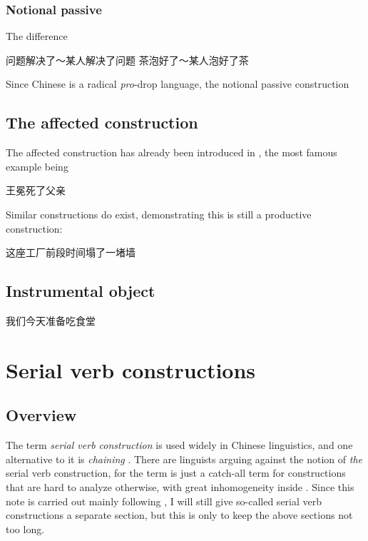 \documentclass[UTF8, a4paper, oneside, scheme=plain]{ctexart}
\newcommand*{\term}[1]{\emph{#1}}
\begin{document}
\subsubsection{Notional passive}

The difference 

\begin{exe}
    \ex 问题解决了～某人解决了问题
    \ex 茶泡好了～某人泡好了茶
\end{exe}

Since Chinese is a radical \term{pro}-drop language,
the notional passive construction 

\subsection{The affected construction}

The affected construction has already been introduced in ,
the most famous example being 
\begin{exe}
    \ex 王冕死了父亲
\end{exe}
Similar constructions do exist, demonstrating this is still a productive construction:
\begin{exe}
    \ex 这座工厂前段时间塌了一堵墙
\end{exe}

\subsection{Instrumental object}

\begin{exe}
    \ex 我们今天准备吃食堂
\end{exe}

\section{Serial verb constructions}

\subsection{Overview}

The term \term{serial verb construction} is used widely in Chinese linguistics,
and one alternative to it is \term{chaining} \citep{po2015chinese}.
There are linguists arguing against the notion of 
\emph{the} serial verb construction,
for the term is just a catch-all term 
for constructions that are hard to analyze otherwise,
with great inhomogeneity inside \citep{paul2008serial}.
Since this note is carried out mainly following \citet{zhudexigrammar},
I will still give so-called serial verb constructions a separate section,
but this is only to keep the above sections not too long.
\end{document}
